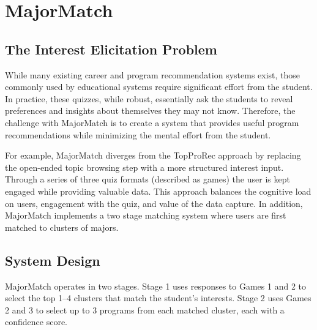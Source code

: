 
\chapter{MajorMatch}

\section{The Interest Elicitation Problem}

While many existing career and program recommendation systems exist, those commonly used by educational systems require significant effort from the student. In practice, these quizzes, while robust, essentially ask the students to reveal preferences and insights about themselves they may not know. Therefore, the challenge with MajorMatch is to create a system that provides useful program recommendations while minimizing the mental effort from the student.

For example, MajorMatch diverges from the TopProRec approach by replacing the open-ended topic browsing step with a more structured interest input. Through a series of three quiz formats (described as games) the user is kept engaged while providing valuable data. This approach balances the cognitive load on users, engagement with the quiz, and value of the data capture. In addition, MajorMatch implements a two stage matching system where users are first matched to clusters of majors.

\section{System Design}

MajorMatch operates in two stages. Stage 1 uses responses to Games 1 and 2 to select the top 1--4 clusters that match the student's interests. Stage 2 uses Games 2 and 3 to select up to 3 programs from each matched cluster, each with a confidence score.

